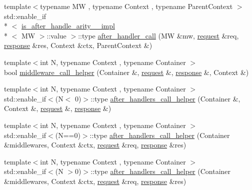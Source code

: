 \begin{DoxyCompactItemize}
\item 
{\footnotesize template$<$typename M\-W , typename Context , typename Parent\-Context $>$ }\\std\-::enable\-\_\-if\\*
$<$ \hyperlink{structcrow_1_1detail_1_1is__after__handle__arity__3__impl}{is\-\_\-after\-\_\-handle\-\_\-arity\-\_\-\_\-impl}\\*
$<$ M\-W $>$\-::value $>$\-::type \hyperlink{namespacecrow_1_1detail_a40996d8c8841b5660c504f36b91ba7ea}{after\-\_\-handler\-\_\-call} (M\-W \&mw, \hyperlink{structcrow_1_1request}{request} \&req, \hyperlink{structcrow_1_1response}{response} \&res, Context \&ctx, Parent\-Context \&)
\item 
{\footnotesize template$<$int N, typename Context , typename Container $>$ }\\bool \hyperlink{namespacecrow_1_1detail_a2303def444f5184e1ed4b23cb2997158}{middleware\-\_\-call\-\_\-helper} (Container \&, \hyperlink{structcrow_1_1request}{request} \&, \hyperlink{structcrow_1_1response}{response} \&, Context \&)
\item 
{\footnotesize template$<$int N, typename Context , typename Container $>$ }\\std\-::enable\-\_\-if$<$(N$<$ 0)$>$\-::type \hyperlink{namespacecrow_1_1detail_aae4ab6b9486e21216741273658bd6815}{after\-\_\-handlers\-\_\-call\-\_\-helper} (Container \&, Context \&, \hyperlink{structcrow_1_1request}{request} \&, \hyperlink{structcrow_1_1response}{response} \&)
\item 
{\footnotesize template$<$int N, typename Context , typename Container $>$ }\\std\-::enable\-\_\-if$<$(N==0)$>$\-::type \hyperlink{namespacecrow_1_1detail_aad451e95cf059336c22588b3a7f68f54}{after\-\_\-handlers\-\_\-call\-\_\-helper} (Container \&middlewares, Context \&ctx, \hyperlink{structcrow_1_1request}{request} \&req, \hyperlink{structcrow_1_1response}{response} \&res)
\item 
{\footnotesize template$<$int N, typename Context , typename Container $>$ }\\std\-::enable\-\_\-if$<$(N $>$0)$>$\-::type \hyperlink{namespacecrow_1_1detail_ae923d5e1ec2e6cb2f964dc734667151c}{after\-\_\-handlers\-\_\-call\-\_\-helper} (Container \&middlewares, Context \&ctx, \hyperlink{structcrow_1_1request}{request} \&req, \hyperlink{structcrow_1_1response}{response} \&res)
\end{DoxyCompactItemize}


